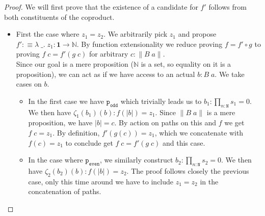 \documentclass[12pt]{report}
\begin{document}
\begin{proof}
We will first prove that the existence of a candidate for $f'$ follows from both constituents of the coproduct.
\begin{itemize}
\item First the case where $z_1= z_2$. 
We arbitrarily pick $z_1$ and propose $f' : \equiv \lambda \;\_.\; z_1 : \mathbf{1} \rightarrow \mathbb{N}$. 
By function extensionality we reduce proving $f= f' \circ g$ to proving $f\; c = f'(g\; c)$ for arbitrary $c : \lVert B\; a\rVert$.\\
Since our goal is a mere proposition ($\mathbb{N}$ is a set, so equality on it is a proposition), we can act as if we have access to an actual $b : B\; a$. 
We take cases on $b$. 
\begin{itemize}
\item In the first case we have $\mathtt{p_{odd}}$ which trivially leads us to $b_1 : \prod_{n : \mathtt{N}}s_1 = 0$. 
We then have $\zeta_1(b_1)(b) : f(|b|) = z_1$. 
Since $\lVert B\; a\rVert$ is a mere proposition, we have $|b| =c$. 
By action on paths on this and $f$ we get $f\; c= z_1$. 
By definition, $f'(g(c)) = z_1$, which we concatenate with $f(c) = z_1$ to conclude get $f\; c = f'(g\; c)$ and this case.
\item In the case where $\mathtt{p_{even}}$, we similarly construct $b_2 : \prod_{n : \mathtt{N}}s_2 = 0$. 
We then have $\zeta_2(b_2)(b) : f(|b|) = z_2$. 
The proof follows closely the previous case, only this time around we have to include $z_1=z_2$ in the concatenation of paths.

\end{itemize}



\end{itemize}
\end{proof}
\end{document}
